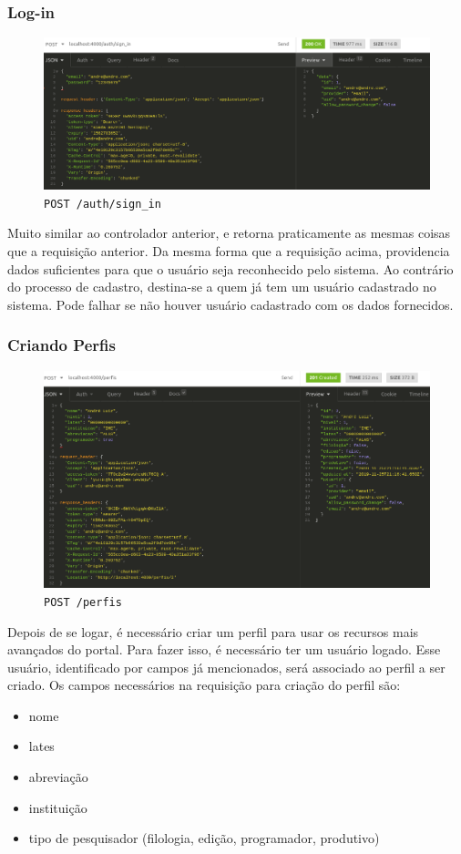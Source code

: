 \subsubsection{Log-in}

\begin{figure}[ht]
  \centering
  \includegraphics[width=.75\textwidth]{figuras/sign-in.png}
  \caption{\texttt{POST /auth/sign\_in}}
  \label{fig:sign-in}
\end{figure}

Muito similar ao controlador anterior, e retorna praticamente as mesmas coisas que a requisição anterior. Da mesma forma
que a requisição acima, providencia dados suficientes para que o usuário seja reconhecido pelo sistema. Ao contrário do
processo de cadastro, destina-se a quem já tem um usuário cadastrado no sistema. Pode falhar se não houver usuário
cadastrado com os dados fornecidos.

\subsubsection{Criando Perfis}

\begin{figure}[h]
  \centering
  \includegraphics[width=.75\textwidth]{figuras/novo-perfil.png}
  \caption{\texttt{POST /perfis}}
  \label{fig:novo-perfil}
\end{figure}

Depois de se logar, é necessário criar um perfil para usar os recursos mais avançados do portal. Para fazer isso, é
necessário ter um usuário logado. Esse usuário, identificado por campos já mencionados, será associado ao perfil a ser
criado. Os campos necessários na requisição para criação do perfil são:
\begin{itemize}
  \item nome
  \item lates
  \item abreviação
  \item instituição
  \item tipo de pesquisador (filologia, edição, programador, produtivo)
\end{itemize}

